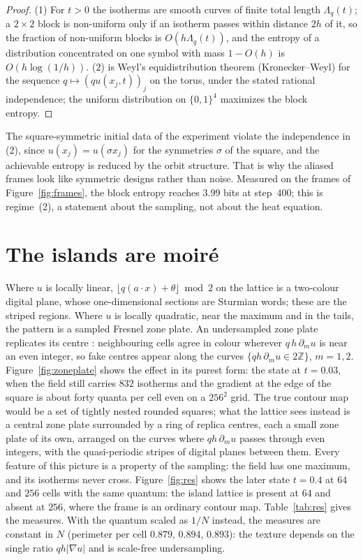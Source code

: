 \documentclass[11pt,a4paper]{article}
\theoremstyle{definition}
\theoremstyle{remark}
\newcommand{\Z}{\mathbb{Z}}
\begin{document}
\begin{proof}
(1) For $t>0$ the isotherms are smooth curves of finite total length
$\Lambda_q(t)$; a $2\times2$ block is non-uniform only if an isotherm
passes within distance $2h$ of it, so the fraction of non-uniform blocks
is $O(h\Lambda_q(t))$, and the entropy of a distribution concentrated on
one symbol with mass $1-O(h)$ is $O(h\log(1/h))$. (2) is Weyl's
equidistribution theorem (Kronecker--Weyl) for the sequence
$q\mapsto(qu(x_j,t))_j$ on the torus, under the stated rational
independence; the uniform distribution on $\{0,1\}^4$ maximizes the
block entropy.
\end{proof}

The square-symmetric initial data of the experiment violate the
independence in (2), since $u(x_j)=u(\sigma x_j)$ for the symmetries
$\sigma$ of the square, and the achievable entropy is reduced by the
orbit structure. That is why the aliased frames look like symmetric
designs rather than noise. Measured on the frames of
Figure~\ref{fig:frames}, the block entropy reaches $3.99$ bits at
step~$400$; this is regime~(2), a statement about the sampling, not
about the heat equation.

\section{The islands are moir\'e}\label{sec:moire}

Where $u$ is locally linear, $\lfloor q(a\cdot x)+\theta\rfloor\bmod2$ on
the lattice is a two-colour digital plane, whose one-dimensional sections
are Sturmian words; these are the striped regions. Where $u$ is locally
quadratic, near the maximum and in the tails, the pattern is a sampled
Fresnel zone plate. An undersampled zone plate replicates its centre
\cite{Amidror,Hologram}:
neighbouring cells agree in colour wherever $q\,h\,\partial_mu$ is near an
even integer, so fake centres appear along the curves
$\{qh\,\partial_mu\in2\Z\}$, $m=1,2$. Figure~\ref{fig:zoneplate} shows the effect
in its purest form: the state at $t=0.03$, when the field still carries
$832$ isotherms and the gradient at the edge of the square is about forty
quanta per cell even on a $256^2$ grid. The true contour map would be a
set of tightly nested rounded squares; what the lattice sees instead is
a central zone plate surrounded by a ring of replica centres, each a
small zone plate of its own, arranged on the curves where $qh\,\partial_mu$
passes through even integers, with the quasi-periodic stripes of digital
planes between them. Every feature of this picture is a property of the
sampling: the field has one maximum, and its isotherms never cross.
Figure~\ref{fig:res} shows the later state $t=0.4$ at $64$ and $256$
cells with the same quantum: the island lattice is present at $64$ and
absent at $256$, where the frame is an ordinary contour map. Table~\ref{tab:res} gives the measures. With the
quantum scaled as $1/N$ instead, the measures are constant in $N$
(perimeter per cell $0.879$, $0.894$, $0.893$): the texture depends on
the single ratio $qh|\nabla u|$ and is scale-free undersampling.
\end{document}
